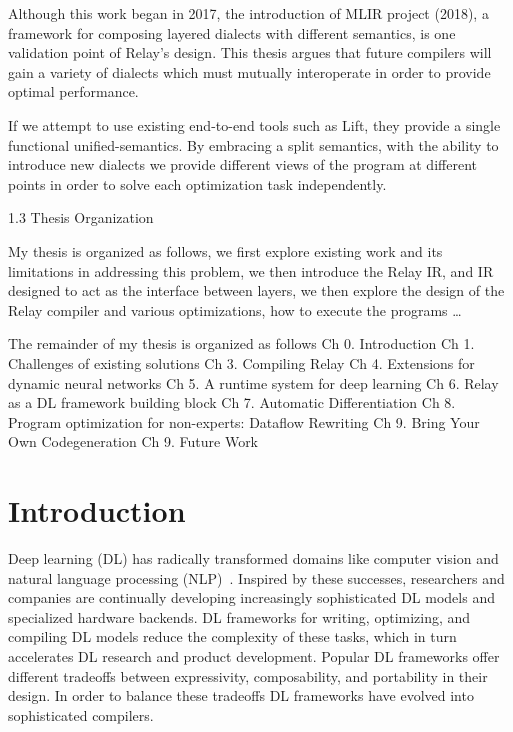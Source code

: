 Although this work began in 2017, the introduction of MLIR project (2018), a framework for composing layered dialects with different semantics, is one validation point of Relay’s design. This thesis argues that future compilers will gain a variety of dialects which must mutually interoperate in order to provide optimal performance.

If we attempt to use existing end-to-end tools such as Lift, they provide a single functional unified-semantics. By embracing a split semantics, with the ability to introduce new dialects we provide different views of the program at different points in order to solve each optimization task independently.


1.3 Thesis Organization

My thesis is organized as follows, we first explore existing work and its limitations in addressing this problem, we then introduce the Relay IR, and IR designed to act as the interface between layers, we then explore the design of the Relay compiler and various optimizations, how to execute the programs …

The remainder of my thesis is organized as follows
Ch 0. Introduction
Ch 1. Challenges of existing solutions
Ch 3. Compiling Relay
Ch 4. Extensions for dynamic neural networks
Ch 5. A runtime system for deep learning
Ch 6. Relay as a DL framework building block
Ch 7. Automatic Differentiation
Ch 8. Program optimization for non-experts: Dataflow Rewriting
Ch 9. Bring Your Own Codegeneration
Ch 9. Future Work







\section{Introduction}
\label{sec:intro}

Deep learning (DL) has radically transformed domains like
  computer vision and
  natural language processing (NLP)~\citep{yolo, recent_trends_in_nlp}.
Inspired by these successes,
  researchers and companies are continually
  developing increasingly sophisticated DL models and
  specialized hardware backends.
DL frameworks for writing, optimizing, and compiling DL models
  reduce the complexity of these tasks,
  which in turn accelerates DL research and product development.
Popular DL frameworks offer different tradeoffs between
  expressivity, composability, and portability in their design.
In order to balance these tradeoffs DL frameworks have
  evolved into sophisticated compilers.

